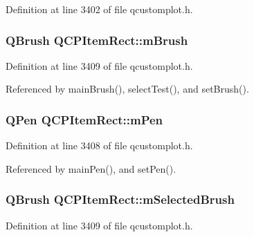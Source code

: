 Definition at line 3402 of file qcustomplot.\+h.

\hypertarget{class_q_c_p_item_rect_a2d7f207fada27588b3a52b19234d3c2e}{}
\subsubsection[{m\+Brush}]{\setlength{\rightskip}{0pt plus 5cm}Q\+Brush Q\+C\+P\+Item\+Rect\+::m\+Brush\hspace{0.3cm}{\ttfamily [protected]}}\label{class_q_c_p_item_rect_a2d7f207fada27588b3a52b19234d3c2e}


Definition at line 3409 of file qcustomplot.\+h.



Referenced by main\+Brush(), select\+Test(), and set\+Brush().

\hypertarget{class_q_c_p_item_rect_aa0d49323628d6752026056bfb52afd86}{}
\subsubsection[{m\+Pen}]{\setlength{\rightskip}{0pt plus 5cm}Q\+Pen Q\+C\+P\+Item\+Rect\+::m\+Pen\hspace{0.3cm}{\ttfamily [protected]}}\label{class_q_c_p_item_rect_aa0d49323628d6752026056bfb52afd86}


Definition at line 3408 of file qcustomplot.\+h.



Referenced by main\+Pen(), and set\+Pen().

\hypertarget{class_q_c_p_item_rect_a21b70eee59b6e19ae0bbdf037b13508f}{}
\subsubsection[{m\+Selected\+Brush}]{\setlength{\rightskip}{0pt plus 5cm}Q\+Brush Q\+C\+P\+Item\+Rect\+::m\+Selected\+Brush\hspace{0.3cm}{\ttfamily [protected]}}\label{class_q_c_p_item_rect_a21b70eee59b6e19ae0bbdf037b13508f}


Definition at line 3409 of file qcustomplot.\+h.



